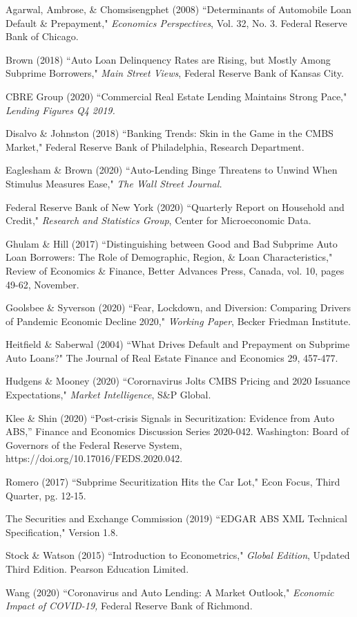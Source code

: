 \documentclass[10.5pt]{article}
\begin{document}
\newpage
\begin{thebibliography}{40}

Agarwal, Ambrose, \& Chomsisengphet (2008) ``Determinants of Automobile Loan Default \& Prepayment," \textit{Economics Perspectives}, Vol. 32, No. 3. Federal Reserve Bank of Chicago. 

Brown (2018) ``Auto Loan Delinquency Rates are Rising, but Mostly Among Subprime Borrowers," \textit{Main Street Views}, Federal Reserve Bank of Kansas City.

CBRE Group (2020) ``Commercial Real Estate Lending Maintains Strong Pace," \textit{Lending Figures Q4 2019.}

Disalvo \& Johnston (2018) ``Banking Trends: Skin in the Game in the CMBS Market," Federal Reserve Bank of Philadelphia, Research Department.

Eaglesham \& Brown (2020) ``Auto-Lending Binge Threatens to Unwind When Stimulus Measures Ease," \textit{The Wall Street Journal.}

Federal Reserve Bank of New York (2020) ``Quarterly Report on Household and Credit," \textit{Research and Statistics Group}, Center for Microeconomic Data.

Ghulam \& Hill (2017) ``Distinguishing between Good and Bad Subprime Auto Loan Borrowers: The Role of Demographic, Region, \& Loan Characteristics," Review of Economics & Finance, Better Advances Press, Canada, vol. 10, pages 49-62, November.

Goolsbee \& Syverson (2020) ``Fear, Lockdown, and Diversion: Comparing Drivers of Pandemic Economic Decline 2020," \textit{Working Paper}, Becker Friedman Institute.

Heitfield \& Saberwal (2004) ``What Drives Default and Prepayment on Subprime Auto Loans?" The Journal of Real Estate Finance and Economics 29, 457-477.

Hudgens \& Mooney (2020) ``Corornavirus Jolts CMBS Pricing and 2020 Issuance Expectations," \textit{Market Intelligence}, S\&P Global.

Klee \& Shin (2020) “Post-crisis Signals in Securitization: Evidence
from Auto ABS,” Finance and Economics Discussion Series 2020-042. Washington: Board
of Governors of the Federal Reserve System, https://doi.org/10.17016/FEDS.2020.042.

Romero (2017) ``Subprime Securitization Hits the Car Lot," Econ Focus, Third Quarter, pg. 12-15.

The Securities and Exchange Commission (2019) ``EDGAR ABS XML Technical Specification," Version 1.8. 

Stock \& Watson (2015) ``Introduction to Econometrics," \textit{Global Edition}, Updated Third Edition. Pearson Education Limited. 

Wang (2020) ``Coronavirus and Auto Lending: A Market Outlook," \textit{Economic Impact of COVID-19,} Federal Reserve Bank of Richmond.

\end{thebibliography}
\end{document}
